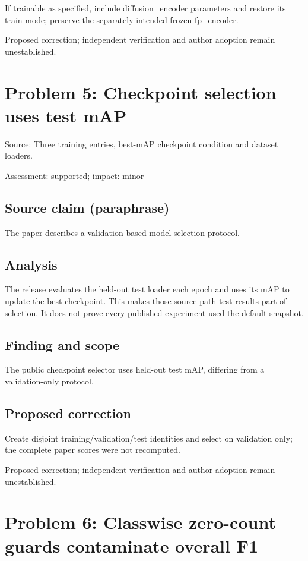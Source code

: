 \documentclass[11pt]{article}
\begin{document}
If trainable as specified, include diffusion\_encoder parameters and restore its train mode; preserve the separately intended frozen fp\_encoder.

Proposed correction; independent verification and author adoption remain unestablished.

\section*{Problem 5: Checkpoint selection uses test mAP}

Source: Three training entries, best-mAP checkpoint condition and dataset loaders.

Assessment: supported; impact: minor

\subsection*{Source claim (paraphrase)}

The paper describes a validation-based model-selection protocol.

\subsection*{Analysis}

The release evaluates the held-out test loader each epoch and uses its mAP to update the best checkpoint. This makes those source-path test results part of selection. It does not prove every published experiment used the default snapshot.

\subsection*{Finding and scope}

The public checkpoint selector uses held-out test mAP, differing from a validation-only protocol.

\subsection*{Proposed correction}

Create disjoint training/validation/test identities and select on validation only; the complete paper scores were not recomputed.

Proposed correction; independent verification and author adoption remain unestablished.

\section*{Problem 6: Classwise zero-count guards contaminate overall F1}
\end{document}
